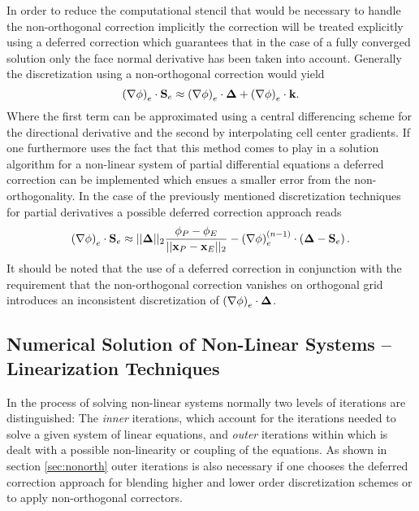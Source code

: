In order to reduce the computational stencil that would be necessary to handle the non-orthogonal correction implicitly the correction will be treated explicitly using a deferred correction which guarantees that in the case of a fully converged solution only the face normal derivative has been taken into account. Generally the discretization using a non-orthogonal correction would yield 
\begin{displaymath}
  \left( \nabla \phi \right)_e \cdot \mathbf{S}_e \approx \left(\nabla \phi \right)_e \cdot \boldsymbol{\Delta} + \left( \nabla \phi \right)_e \cdot \mathbf{k}.
\end{displaymath}
Where the first term can be approximated using a central differencing scheme for the directional derivative and the second by interpolating cell center gradients. If one furthermore uses the fact that this method comes to play in a solution algorithm for a non-linear system of partial differential equations a deferred correction can be implemented which ensues a smaller error from the non-orthogonality. In the case of the previously mentioned discretization techniques for partial derivatives a possible deferred correction approach reads
\begin{displaymath}
  \left( \nabla \phi \right)_e \cdot \mathbf{S}_e \approx ||\boldsymbol{\Delta}||_2 \frac{\phi_P - \phi_E}{||\mathbf{x}_P - \mathbf{x}_E||_2} - \left(\nabla \phi \right)_e^{(n-1)} \cdot \left(\boldsymbol{\Delta} - \mathbf{S}_e \right).
\end{displaymath}
It should be noted that the use of a deferred correction in conjunction with the requirement that the non-orthogonal correction vanishes on orthogonal grid introduces an inconsistent discretization of \( \left(\nabla \phi \right)_e \cdot \boldsymbol{\Delta} \).

\subsection{Numerical Solution of Non-Linear Systems -- Linearization Techniques}
\label{sec:nonlinear}

In the process of solving non-linear systems normally two levels of iterations are distinguished: The \emph{inner} iterations, which account for the iterations needed to solve a given system of linear equations, and \emph{outer} iterations within which is dealt with a possible non-linearity or coupling of the equations. As shown in section \ref{sec:nonorth} outer iterations is also necessary if one chooses the deferred correction approach for blending higher and lower order discretization schemes or to apply non-orthogonal correctors.

